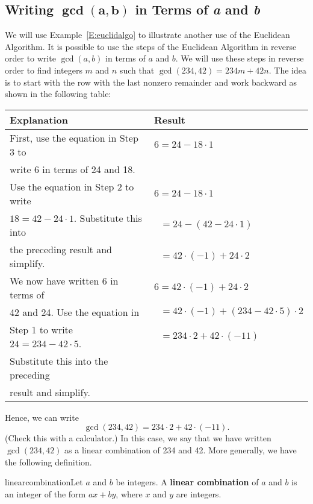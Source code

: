 \subsection*{Writing $\boldsymbol{\gcd (a, b)}$  in Terms of \emph{a} and \emph{b}}
We will use Example~\ref{E:euclidalgo} to illustrate another use of the Euclidean Algorithm.  It is possible to use the steps of the Euclidean Algorithm in reverse order to write  
$\gcd( {a, b} )$  in terms of  $a$  and  $b$.  We will use these steps in reverse order to find integers  $m$  and  $n$  such that  
$\gcd( {234, 42} ) = 234m + 42n$.  The idea is to start with the row with the last nonzero remainder and work backward as shown in the following table:

\begin{center}
\begin{tabular}{| l | l |} \hline
\textbf{Explanation}  &  \textbf{Result} \\ \hline
First, use the equation in Step 3 to  &  $6 = 24 - 18 \cdot 1$  \\ 
write 6 in terms of  24  and  18. &  \\ \hline
Use the equation in Step 2 to write   &   $6 = 24 - 18 \cdot 1$ \\
$18 = 42 - 24 \cdot 1$. Substitute this into &  $\ \ \, = 24 - \left( {42 - 24 \cdot 1} \right)$ \\
the preceding result and simplify.  & $\ \ \, = 42 \cdot \left( { - 1} \right) + 24 \cdot 2 $ \\ \hline
We now have written  6  in terms of &  $6 = 42 \cdot \left( { - 1} \right) + 24 \cdot 2 $ \\
42 and 24.  Use the equation in  & $\ \ \, = 42 \cdot \left( { - 1} \right) + \left( {234 - 42 \cdot 5} \right) \cdot 2 $ \\
Step 1 to write $24 = 234 - 42 \cdot 5$.   &  $\ \ \, = 234 \cdot 2 + 42 \cdot \left( { - 11} \right)$  \\ 
Substitute this into the preceding &  \\ 
result and simplify.  &  \\ \hline
\end{tabular}
\end{center}
Hence, we can write  
\[
\gcd( {234, 42} ) = 234 \cdot 2 + 42 \cdot ( { - 11} ).
\]
(Check this with a calculator.)  In this case, we say that we have written \linebreak 
$\gcd( {234, 42} )$ as a linear combination of  234 and  42.  More generally, we have the following definition.
%
\begin{defbox}{linearcombination}{Let  $a$  and  $b$  be integers.  A \textbf{linear combination}
%
 of  $a$  and  $b$  is an integer of the form  $ax + by$, where  $x$  and  $y$  are integers.}
\end{defbox}
